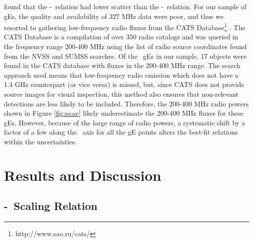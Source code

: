 \documentclass{emulateapj}
\begin{document}
\citet{birzan08} found that the \pcav-\pthree\ relation had lower
scatter than the \pcav-\phigh\ relation. For our sample of gEs, the
quality and availability of 327 MHz data were poor, and thus we
resorted to gathering low-frequency radio fluxes from the CATS
Database\footnote{http://www.sao.ru/cats/} \citep{cats}. The CATS
Database is a compilation of over 350 radio catalogs and was queried
in the frequency range 200-400 MHz using the list of radio source
coordinates found from the NVSS and SUMSS searches. Of the \samp\ gEs
in our sample, 17 objects were found in the CATS database with fluxes
in the 200-400 MHz range. The search approach used means that
low-frequency radio emission which does not have a 1.4 GHz counterpart
(or vice versa) is missed, but, since CATS does not provide source
images for visual inspection, this method also ensures that
non-relevant detections are less likely to be included. Therefore, the
200-400 MHz radio powers shown in Figure \ref{fig:pcav} likely
underestimate the 200-400 MHz fluxes for these gEs. However, because
of the large range of radio powers, a systematic shift by a factor of
a few along the \radpow\ axis for all the gE points alters the
best-fit relations within the uncertainties.


\section{Results and Discussion}
\label{sec:r&d}

\subsection{\pjet-\prad\ Scaling Relation}
\label{sec:relation}
\end{document}
